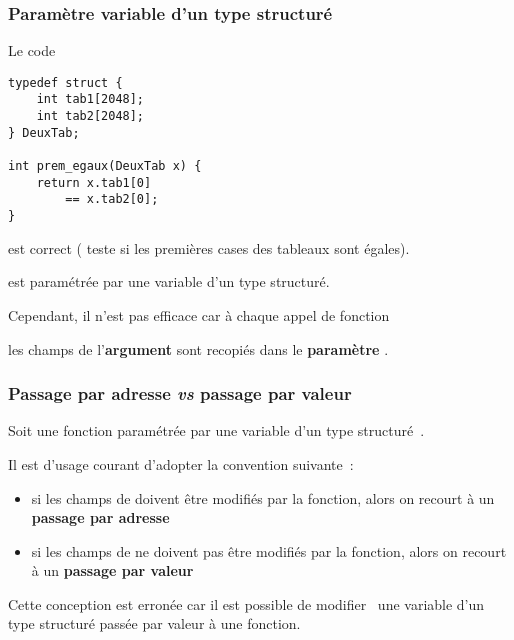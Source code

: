 \begin{frame}[fragile]
\frametitle{Paramètre variable d'un type structuré}
Le code
\begin{multicols}{2}
\begin{lstlisting}
typedef struct {
    int tab1[2048];
    int tab2[2048];
} DeuxTab;

int prem_egaux(DeuxTab x) {
    return x.tab1[0]
        == x.tab2[0];
}
\end{lstlisting}
\end{multicols}
est correct ( teste si les premières cases des tableaux
sont égales).
\smallskip

 est \alert{paramétrée} par une variable
d'un \alert{type structuré}.
\medskip

Cependant, il n'est pas efficace car à chaque appel de fonction
\begin{center}
\end{center}
les champs de l'{\bf argument}  sont recopiés dans le
{\bf paramètre} .
\end{frame}

\begin{frame}[fragile]
\frametitle{Passage par adresse {\em vs} passage par valeur}
Soit une fonction  paramétrée par une variable  d'un
type structuré~.
\medskip

Il est d'usage courant d'adopter la convention suivante~:
\smallskip

\begin{itemize}
    \item si les champs de  doivent être modifiés par la fonction,
    alors on recourt à un {\bf passage par adresse}
    \begin{center}
    \end{center}
    \smallskip

    \item si les champs de  ne doivent pas être modifiés par
    la fonction, alors on recourt à un {\bf passage par valeur}
    \begin{center}
    \end{center}
\end{itemize}
\bigskip

\alert{Cette conception est erronée} car il est possible de \og modifier \fg\,
une variable d'un type structuré passée par valeur à une fonction.
\end{frame}

